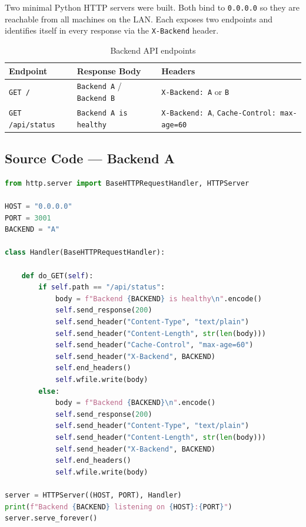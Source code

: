 \documentclass[12pt,a4paper]{article}
\begin{document}
Two minimal Python HTTP servers were built. Both bind to \texttt{0.0.0.0} so they are reachable from all machines on the LAN. Each exposes two endpoints and identifies itself in every response via the \texttt{X-Backend} header.

\begin{table}[h!]
\centering
\caption{Backend API endpoints}
\begin{tabular}{lll}
\toprule
\textbf{Endpoint} & \textbf{Response Body} & \textbf{Headers} \\
\midrule
\texttt{GET /} & \texttt{Backend A} / \texttt{Backend B} & \texttt{X-Backend: A} or \texttt{B} \\
\texttt{GET /api/status} & \texttt{Backend A is healthy} & \texttt{X-Backend: A}, \texttt{Cache-Control: max-age=60} \\
\bottomrule
\end{tabular}
\end{table}

\subsection{Source Code --- Backend A}

\begin{lstlisting}[language=Python, caption=backends/backend-a/server.py]
from http.server import BaseHTTPRequestHandler, HTTPServer

HOST = "0.0.0.0"
PORT = 3001
BACKEND = "A"

class Handler(BaseHTTPRequestHandler):

    def do_GET(self):
        if self.path == "/api/status":
            body = f"Backend {BACKEND} is healthy\n".encode()
            self.send_response(200)
            self.send_header("Content-Type", "text/plain")
            self.send_header("Content-Length", str(len(body)))
            self.send_header("Cache-Control", "max-age=60")
            self.send_header("X-Backend", BACKEND)
            self.end_headers()
            self.wfile.write(body)
        else:
            body = f"Backend {BACKEND}\n".encode()
            self.send_response(200)
            self.send_header("Content-Type", "text/plain")
            self.send_header("Content-Length", str(len(body)))
            self.send_header("X-Backend", BACKEND)
            self.end_headers()
            self.wfile.write(body)

server = HTTPServer((HOST, PORT), Handler)
print(f"Backend {BACKEND} listening on {HOST}:{PORT}")
server.serve_forever()
\end{lstlisting}
\end{document}
